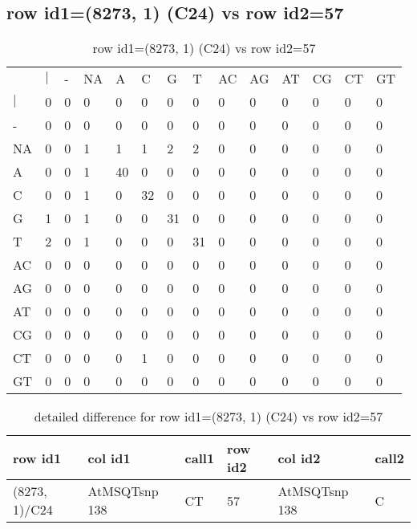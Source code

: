 \subsection{row id1=(8273, 1) (C24) vs row id2=57}
\begin{center}
\begin{longtable}{|l|l|l|l|l|l|l|l|l|l|l|l|l|l|}
\caption{row id1=(8273, 1) (C24) vs row id2=57} \label{table_dm424}\\
\hline
\\
\hline
&$|$&-&NA&A&C&G&T&AC&AG&AT&CG&CT&GT\\
$|$&0&0&0&0&0&0&0&0&0&0&0&0&0\\
-&0&0&0&0&0&0&0&0&0&0&0&0&0\\
NA&0&0&1&1&1&2&2&0&0&0&0&0&0\\
A&0&0&1&40&0&0&0&0&0&0&0&0&0\\
C&0&0&1&0&32&0&0&0&0&0&0&0&0\\
G&1&0&1&0&0&31&0&0&0&0&0&0&0\\
T&2&0&1&0&0&0&31&0&0&0&0&0&0\\
AC&0&0&0&0&0&0&0&0&0&0&0&0&0\\
AG&0&0&0&0&0&0&0&0&0&0&0&0&0\\
AT&0&0&0&0&0&0&0&0&0&0&0&0&0\\
CG&0&0&0&0&0&0&0&0&0&0&0&0&0\\
CT&0&0&0&0&1&0&0&0&0&0&0&0&0\\
GT&0&0&0&0&0&0&0&0&0&0&0&0&0\\
\hline
\end{longtable}
\end{center}

\begin{center}
\begin{longtable}{|l|l|l|l|l|l|}
\caption{detailed difference for row id1=(8273, 1) (C24) vs row id2=57} \label{table_dm425}\\
\hline
row id1&col id1&call1&row id2&col id2&call2\\
\hline
(8273, 1)/C24&AtMSQTsnp 138&CT&57&AtMSQTsnp 138&C\\
\hline
\end{longtable}
\end{center}

